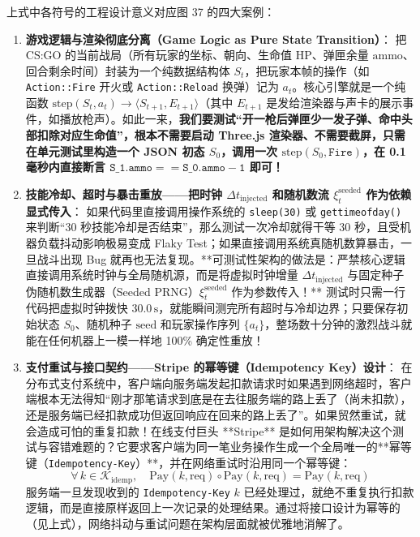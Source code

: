 \documentclass[a4paper]{article}
\begin{document}
上式中各符号的工程设计意义对应图 37 的四大案例：
\begin{enumerate}
    \item \textbf{游戏逻辑与渲染彻底分离（Game Logic as Pure State Transition）}：
    把 CS:GO 的当前战局（所有玩家的坐标、朝向、生命值 $\mathrm{HP}$、弹匣余量 $\mathrm{ammo}$、回合剩余时间）封装为一个纯数据结构体 $S_t$，把玩家本帧的操作（如 \texttt{Action::Fire} 开火或 \texttt{Action::Reload} 换弹）记为 $a_t$。核心引擎就是一个纯函数 $\mathrm{step}(S_t, a_t) \to \langle S_{t+1}, E_{t+1} \rangle$（其中 $E_{t+1}$ 是发给渲染器与声卡的展示事件，如播放枪声）。如此一来，\textbf{我们要测试“开一枪后弹匣少一发子弹、命中头部扣除对应生命值”，根本不需要启动 Three.js 渲染器、不需要截屏，只需在单元测试里构造一个 JSON 初态 $S_0$，调用一次 $\mathrm{step}(S_0, \mathtt{Fire})$，在 0.1 毫秒内直接断言 $\mathtt{S\_1.ammo == S\_0.ammo - 1}$ 即可！}
    \item \textbf{技能冷却、超时与暴击重放——把时钟 $\Delta t_{\mathrm{injected}}$ 和随机数流 $\xi_t^{\mathrm{seeded}}$ 作为依赖显式传入}：
    如果代码里直接调用操作系统的 \texttt{sleep(30)} 或 \texttt{gettimeofday()} 来判断“30 秒技能冷却是否结束”，那么测试一次冷却就得干等 30 秒，且受机器负载抖动影响极易变成 Flaky Test；如果直接调用系统真随机数算暴击，一旦战斗出现 Bug 就再也无法复现。**可测试性架构的做法是：严禁核心逻辑直接调用系统时钟与全局随机源，而是将虚拟时钟增量 $\Delta t_{\mathrm{injected}}$ 与固定种子伪随机数生成器（Seeded PRNG）$\xi_t^{\mathrm{seeded}}$ 作为参数传入！** 测试时只需一行代码把虚拟时钟拨快 $30.0\,\mathrm{s}$，就能瞬间测完所有超时与冷却边界；只要保存初始状态 $S_0$、随机种子 $\mathrm{seed}$ 和玩家操作序列 $\{a_t\}$，整场数十分钟的激烈战斗就能在任何机器上一模一样地 100\% 确定性重放！
    \item \textbf{支付重试与接口契约——Stripe 的幂等键（Idempotency Key）设计}：
    在分布式支付系统中，客户端向服务端发起扣款请求时如果遇到网络超时，客户端根本无法得知“刚才那笔请求到底是在去往服务端的路上丢了（尚未扣款），还是服务端已经扣款成功但返回响应在回来的路上丢了”。如果贸然重试，就会造成可怕的重复扣款！在线支付巨头 **Stripe** 是如何用架构解决这个测试与容错难题的？它要求客户端为同一笔业务操作生成一个全局唯一的**幂等键（\texttt{Idempotency-Key}）**，并在网络重试时沿用同一个幂等键：
    \begin{equation}
    \forall\, k \in \mathcal{K}_{\mathrm{idemp}},\quad
    \mathrm{Pay}(k, \mathrm{req}) \circ \mathrm{Pay}(k, \mathrm{req}) = \mathrm{Pay}(k, \mathrm{req})
    \end{equation}
    服务端一旦发现收到的 \texttt{Idempotency-Key} $k$ 已经处理过，就绝不重复执行扣款逻辑，而是直接原样返回上一次记录的处理结果。通过将接口设计为幂等的（见上式），网络抖动与重试问题在架构层面就被优雅地消解了。

\end{enumerate}
\end{document}
